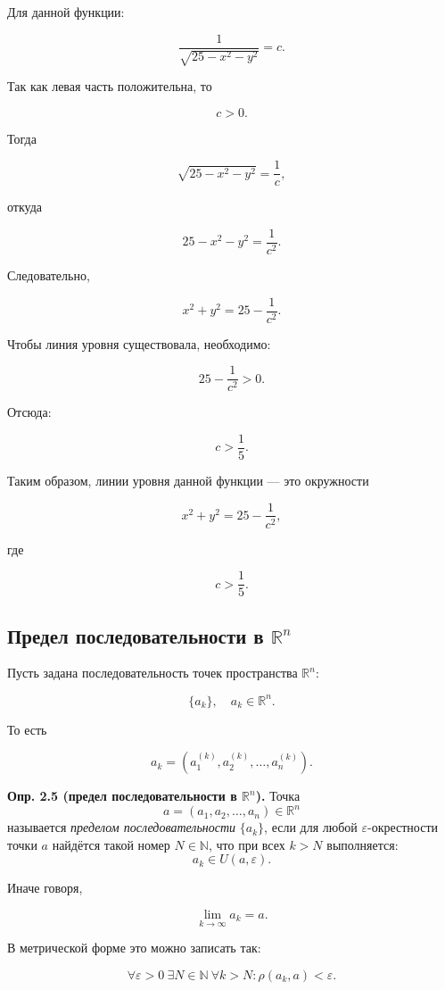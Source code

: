 \documentclass[a4paper,12pt]{article}
\begin{document}
Для данной функции:

\[
\frac{1}{\sqrt{25-x^2-y^2}}=c.
\]

Так как левая часть положительна, то

\[
c>0.
\]

Тогда

\[
\sqrt{25-x^2-y^2}=\frac{1}{c},
\]

откуда

\[
25-x^2-y^2=\frac{1}{c^2}.
\]

Следовательно,

\[
x^2+y^2=25-\frac{1}{c^2}.
\]

Чтобы линия уровня существовала, необходимо:

\[
25-\frac{1}{c^2}>0.
\]

Отсюда:

\[
c>\frac{1}{5}.
\]

Таким образом, линии уровня данной функции — это окружности

\[
x^2+y^2=25-\frac{1}{c^2},
\]

где

\[
c>\frac{1}{5}.
\]

\subsection*{Предел последовательности в $\mathbb{R}^n$}

Пусть задана последовательность точек пространства $\mathbb{R}^n$:

\[
\{a_k\}, \quad a_k\in \mathbb{R}^n.
\]

То есть

\[
a_k=
\left(
a_1^{(k)},
a_2^{(k)},
\ldots,
a_n^{(k)}
\right).
\]

\begin{definitionbox}
\textbf{Опр. 2.5 (предел последовательности в $\mathbb{R}^n$).}
Точка
\[
a=(a_1,a_2,\ldots,a_n)\in \mathbb{R}^n
\]
называется \textit{пределом последовательности} $\{a_k\}$, если для любой $\varepsilon$-окрестности точки $a$ найдётся такой номер $N\in\mathbb{N}$, что при всех $k>N$ выполняется:
\[
a_k\in U(a,\varepsilon).
\]
\end{definitionbox}

Иначе говоря,

\[
\lim_{k\to\infty} a_k=a.
\]

В метрической форме это можно записать так:

\[
\forall \varepsilon>0\ \exists N\in\mathbb{N}\ \forall k>N:
\rho(a_k,a)<\varepsilon.
\]
\end{document}
